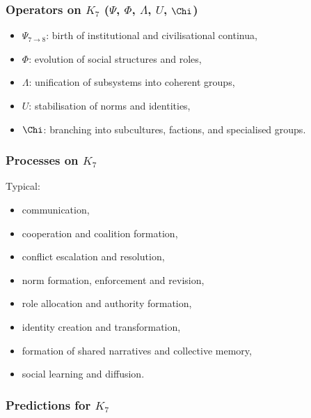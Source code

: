 \subsubsection{Operators on \texorpdfstring{$K_7$}{K_7} (\texorpdfstring{$\Psi$}{\Psi}, \texorpdfstring{$\Phi$}{\Phi}, \texorpdfstring{$\Lambda$}{\Lambda}, \texorpdfstring{$U$}{U}, \texorpdfstring{$\Chi$}{\Chi})}

\begin{itemize}
    \item $\Psi_{7\to8}$: birth of institutional and civilisational continua,
    \item $\Phi$: evolution of social structures and roles,
    \item $\Lambda$: unification of subsystems into coherent groups,
    \item $U$: stabilisation of norms and identities,
    \item $\Chi$: branching into subcultures, factions, and specialised groups.
\end{itemize}

\subsubsection{Processes on \texorpdfstring{$K_7$}{K_7}}

Typical:
\begin{itemize}
    \item communication,
    \item cooperation and coalition formation,
    \item conflict escalation and resolution,
    \item norm formation, enforcement and revision,
    \item role allocation and authority formation,
    \item identity creation and transformation,
    \item formation of shared narratives and collective memory,
    \item social learning and diffusion.
\end{itemize}

\subsubsection{Predictions for \texorpdfstring{$K_7$}{K_7}}

